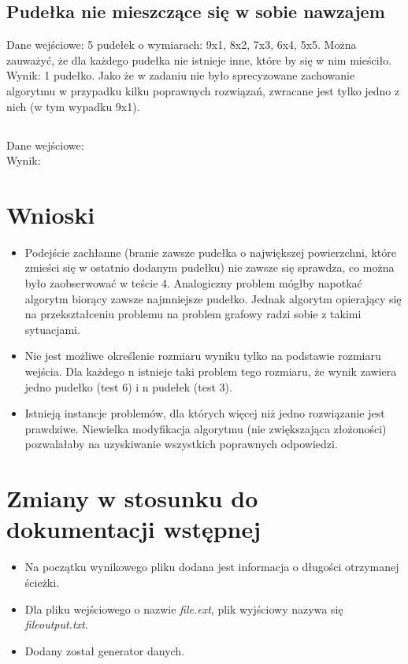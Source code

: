 \documentclass{article}
\begin{document}
\subsection{Pudełka nie mieszczące się w sobie nawzajem}
Dane wejściowe: 5 pudełek o wymiarach: 9x1, 8x2, 7x3, 6x4, 5x5. Można zauważyć, że dla każdego pudełka nie istnieje inne, które by się w nim mieściło.\\
Wynik: 1 pudełko. Jako że w zadaniu nie było sprecyzowane zachowanie algorytmu w przypadku kilku poprawnych rozwiązań, zwracane jest tylko jedno z nich (w tym wypadku 9x1).

\subsection{}
Dane wejściowe:\\
Wynik:

\section{Wnioski}
\begin{itemize}
\item Podejście zachłanne (branie zawsze pudełka o największej powierzchni, które zmieści się w ostatnio dodanym pudełku) nie zawsze się sprawdza, co można było zaobserwować w teście 4. Analogiczny problem mógłby napotkać algorytm biorący zawsze najmniejsze pudełko. Jednak algorytm opierający się na przekształceniu problemu na problem grafowy radzi sobie z takimi sytuacjami.
\item Nie jest możliwe określenie rozmiaru wyniku tylko na podstawie rozmiaru wejścia. Dla każdego n istnieje taki problem tego rozmiaru, że wynik zawiera jedno pudełko (test 6) i n pudełek (test 3).
\item Istnieją instancje problemów, dla których więcej niż jedno rozwiązanie jest prawdziwe. Niewielka modyfikacja algorytmu (nie zwiększająca złożoności) pozwalałaby na uzyskiwanie wszystkich poprawnych odpowiedzi.
\end{itemize}

\section{Zmiany w stosunku do dokumentacji wstępnej}
\begin{itemize}
\item Na początku wynikowego pliku dodana jest informacja o długości otrzymanej ścieżki.
\item Dla pliku wejściowego o nazwie \textit{file.ext}, plik wyjściowy nazywa się \textit{file\textunderscore output.txt}.
\item Dodany został generator danych.
\end{itemize}
\end{document}
